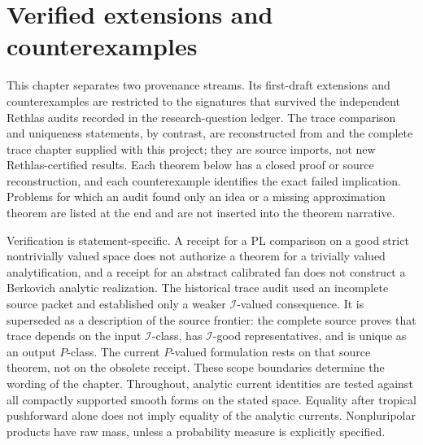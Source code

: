 \chapter{Verified extensions and counterexamples}
\label{chap:verified-extensions}

This chapter separates two provenance streams.  Its first-draft extensions
and counterexamples are restricted to the signatures that survived the
independent Rethlas audits recorded in the research-question ledger.  The
trace comparison and uniqueness statements, by contrast, are reconstructed
from \cite{DX24} and the complete trace chapter supplied with this project;
they are source imports, not new Rethlas-certified results.  Each theorem
below has a closed proof or source reconstruction, and each counterexample
identifies the exact failed implication.  Problems for which an audit found
only an idea or a missing approximation theorem are listed at the end and
are not inserted into the theorem narrative.

Verification is statement-specific. A receipt for a PL comparison on a
good strict nontrivially valued space does not authorize a theorem for a
trivially valued analytification, and a receipt for an abstract calibrated
fan does not construct a Berkovich analytic realization.  The historical
trace audit used an incomplete source packet and established only a weaker
$\mathcal I$-valued consequence.  It is superseded as a description of the
source frontier: the complete source proves that trace depends on the input
$\mathcal I$-class, has $\mathcal I$-good representatives, and is unique
as an output $P$-class.  The current $P$-valued formulation rests on that
source theorem, not on the obsolete receipt.  These scope boundaries determine the wording of the chapter.
Throughout, analytic current identities are tested against all compactly
supported smooth forms on the stated space. Equality after tropical
pushforward alone does not imply equality of the analytic currents.
Nonpluripolar products have raw mass, unless a probability measure is
explicitly specified.

